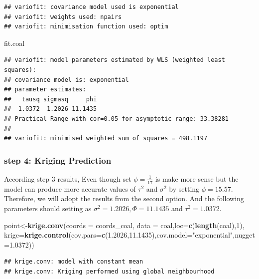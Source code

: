 \documentclass[]{article}
\newenvironment{Shaded}{\begin{snugshade}}{\end{snugshade}}
\newcommand{\KeywordTok}[1]{\textcolor[rgb]{0.13,0.29,0.53}{\textbf{#1}}}
\newcommand{\DataTypeTok}[1]{\textcolor[rgb]{0.13,0.29,0.53}{#1}}
\newcommand{\DecValTok}[1]{\textcolor[rgb]{0.00,0.00,0.81}{#1}}
\newcommand{\FloatTok}[1]{\textcolor[rgb]{0.00,0.00,0.81}{#1}}
\newcommand{\StringTok}[1]{\textcolor[rgb]{0.31,0.60,0.02}{#1}}
\newcommand{\NormalTok}[1]{#1}
\begin{document}
\begin{verbatim}
## variofit: covariance model used is exponential 
## variofit: weights used: npairs 
## variofit: minimisation function used: optim
\end{verbatim}

\begin{Shaded}
\begin{Highlighting}[]
\NormalTok{fit.coal}
\end{Highlighting}
\end{Shaded}

\begin{verbatim}
## variofit: model parameters estimated by WLS (weighted least squares):
## covariance model is: exponential
## parameter estimates:
##   tausq sigmasq     phi 
##  1.0372  1.2026 11.1435 
## Practical Range with cor=0.05 for asymptotic range: 33.38281
## 
## variofit: minimised weighted sum of squares = 498.1197
\end{verbatim}

\subsubsection{step 4: Kriging
Prediction}\label{step-4-kriging-prediction}

According step 3 results, Even though set \(\phi=\frac{1}{17}\) is make
more sense but the model can produce more accurate values of \(\tau^2\)
and \(\sigma^2\) by setting \(\phi=15.57\). Therefore, we will adopt the
results from the second option. And the following parameters should
setting as \(\sigma^2=1.2026,\Phi=11.1435\) and \(\tau^2=1.0372\).

\begin{Shaded}
\begin{Highlighting}[]
\NormalTok{point<-}\KeywordTok{krige.conv}\NormalTok{(}\DataTypeTok{coords =}\NormalTok{ coords_coal, }\DataTypeTok{data =}\NormalTok{ coal,}\DataTypeTok{loc=}\KeywordTok{c}\NormalTok{(}\KeywordTok{length}\NormalTok{(coal),}\DecValTok{1}\NormalTok{),}
                  \DataTypeTok{krige=}\KeywordTok{krige.control}\NormalTok{(}\DataTypeTok{cov.pars=}\KeywordTok{c}\NormalTok{(}\FloatTok{1.2026}\NormalTok{,}\FloatTok{11.1435}\NormalTok{),}\DataTypeTok{cov.model=}\StringTok{"exponential"}\NormalTok{,}\DataTypeTok{nugget=}\FloatTok{1.0372}\NormalTok{))}
\end{Highlighting}
\end{Shaded}

\begin{verbatim}
## krige.conv: model with constant mean
## krige.conv: Kriging performed using global neighbourhood
\end{verbatim}
\end{document}
